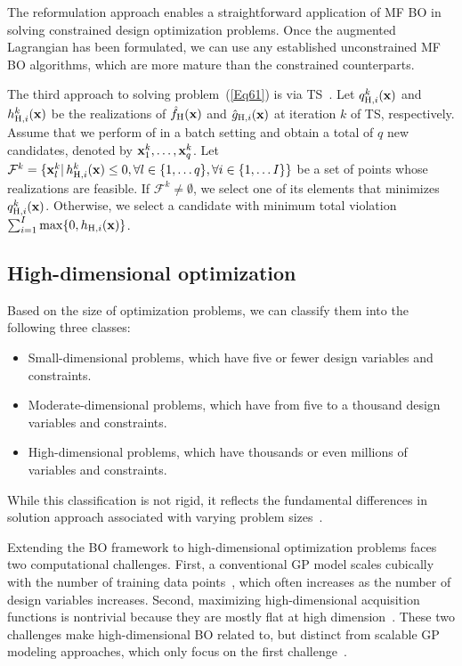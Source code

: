 \documentclass[iicol,sn-basic]{sn-jnl}%
\begin{document}
The reformulation approach enables a straightforward application of MF BO in solving constrained design optimization problems.
Once the augmented Lagrangian has been formulated, we can use any established unconstrained MF BO algorithms, which are more mature than the constrained counterparts.

The third approach to solving problem~(\ref{Eq61}) is via TS~\citep{Eriksson2021}.
Let $q^k_{\text{H},i}({\bf x})$ and $h^k_{\text{H},i}({\bf x})$ be the realizations of $\hat{f}_{\text{H}}({\bf x})$ and $\hat{g}_{\text{H},i}({\bf x})$ at iteration $k$ of TS, respectively.
Assume that we perform  of  in a batch setting and obtain a total of $q$ new candidates, denoted by ${\bf x}^k_1,\dots, {\bf x}^k_q$.
Let $\mathcal{F}^k = \{{\bf x}^k_l|\,h^k_{\text{H},i}({\bf x}) \leq 0,\forall l \in \{1,\dots q\}, \forall i \in \{1,\dots I\}\}$ be a set of points whose realizations are feasible.
If $\mathcal{F}^k \neq \emptyset$, we select one of its elements that minimizes $q^k_{\text{H},i}({\bf x})$.
Otherwise, we select a candidate with minimum total violation
$\sum_{i=1}^{I} \max\{0,h_{\text{H},i}({\bf x})\}$.

\subsection{High-dimensional optimization}\label{Sec62}

Based on the size of optimization problems, we can classify them into the following three classes: 
\begin{itemize}
	\item Small-dimensional problems, which have five or fewer design variables and constraints.
	
	\item Moderate-dimensional problems, which have from five to a thousand design variables and constraints.
	
	\item High-dimensional problems, which have thousands or even millions of variables and constraints.
\end{itemize}
While this classification is not rigid, it reflects the fundamental differences in solution approach associated with varying problem sizes~\citep{Luenberger2008}.

Extending the BO framework to high-dimensional optimization problems faces two computational challenges.
First, a conventional GP model scales cubically with the number of training data points~\citep{Rasmussen2006}, which often increases as the number of design variables increases.
Second, maximizing high-dimensional acquisition functions is nontrivial because they are mostly flat at high dimension~\citep{Rana2017}.
These two challenges make high-dimensional BO related to, but distinct from scalable GP modeling approaches, which only focus on the first challenge~\citep{LiuH2020}. 
\end{document}
